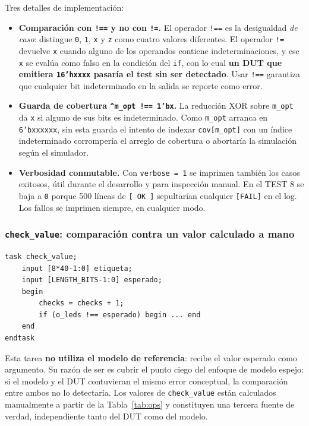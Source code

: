 \documentclass[12pt,a4paper]{article}
\begin{document}
Tres detalles de implementación:

\begin{itemize}[leftmargin=2em,itemsep=0.3em]
  \item \textbf{Comparación con \texttt{!==} y no con \texttt{!=}.} El operador
        \texttt{!==} es la desigualdad \emph{de caso}: distingue \texttt{0},
        \texttt{1}, \texttt{x} y \texttt{z} como cuatro valores diferentes. El
        operador \texttt{!=} devuelve \texttt{x} cuando alguno de los operandos
        contiene indeterminaciones, y ese \texttt{x} se evalúa como falso en la
        condición del \texttt{if}, con lo cual \textbf{un DUT que emitiera
        \texttt{16'hxxxx} pasaría el test sin ser detectado}. Usar \texttt{!==}
        garantiza que cualquier bit indeterminado en la salida se reporte como
        error.

  \item \textbf{Guarda de cobertura \texttt{\^{}m\_opt !== 1'bx}.} La reducción
        XOR sobre \texttt{m\_opt} da \texttt{x} si alguno de sus bits es
        indeterminado. Como \texttt{m\_opt} arranca en \texttt{6'bxxxxxx}, sin
        esta guarda el intento de indexar \texttt{cov[m\_opt]} con un índice
        indeterminado corrompería el arreglo de cobertura o abortaría la
        simulación según el simulador.

  \item \textbf{Verbosidad conmutable.} Con \texttt{verbose = 1} se imprimen
        también los casos exitosos, útil durante el desarrollo y para inspección
        manual. En el TEST 8 se baja a \texttt{0} porque 500 líneas de
        \texttt{[ OK ]} sepultarían cualquier \texttt{[FAIL]} en el log. Los
        fallos se imprimen siempre, en cualquier modo.
\end{itemize}

\subsubsection{\texttt{check\_value}: comparación contra un valor calculado a mano}

\begin{lstlisting}[caption={Chequeo contra un valor esperado explícito.}]
task check_value;
    input [8*40-1:0] etiqueta;
    input [LENGTH_BITS-1:0] esperado;
    begin
        checks = checks + 1;
        if (o_leds !== esperado) begin ... end
    end
endtask
\end{lstlisting}

Esta tarea \textbf{no utiliza el modelo de referencia}: recibe el valor esperado
como argumento. Su razón de ser es cubrir el punto ciego del enfoque de modelo
espejo: si el modelo y el DUT contuvieran el mismo error conceptual, la
comparación entre ambos no lo detectaría. Los valores de \texttt{check\_value}
están calculados manualmente a partir de la Tabla~\ref{tab:ops} y constituyen
una tercera fuente de verdad, independiente tanto del DUT como del modelo.
\end{document}
